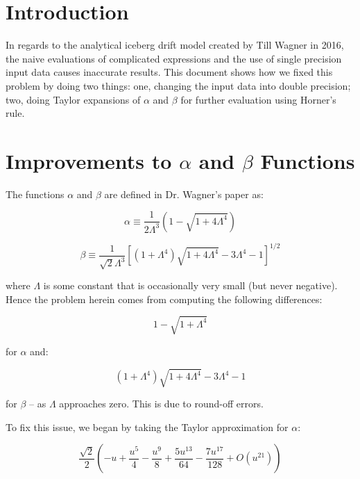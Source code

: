 \documentclass{article}
\begin{document}
\section{Introduction}

    In regards to the analytical iceberg drift model created by Till
Wagner in 2016, the naive evaluations of complicated expressions 
and the use of single precision input data causes inaccurate results. 
This document shows how we fixed this problem by doing two things: 
one, changing the input data into double precision; two, doing Taylor 
expansions of $\alpha$ and $\beta$ for further evaluation using 
Horner's rule.
    
\section{Improvements to $\alpha$ and $\beta$ Functions}
The functions $\alpha$ and $\beta$ are defined in Dr. Wagner's paper
as:

    \begin{equation}
        \alpha \equiv \frac{1}{2\Lambda^3}(1-\sqrt{1+4\Lambda^4})
    \end{equation} 

    \begin{equation}
        \beta \equiv \frac{1}{\sqrt{2}\Lambda^3}[(1+\Lambda^4)
        \sqrt{1+4\Lambda^4} -3\Lambda^4-1]^{1/2}
    \end{equation}


where $\Lambda$ is some constant that is occasionally very small (but
never negative). Hence the problem herein comes from computing the 
following differences:

    \begin{equation}
        1 - \sqrt{1+\Lambda^4}
    \end{equation}

for $\alpha$ and:

    \begin{equation}
       (1+\Lambda^4)\sqrt{1+4\Lambda^4} -3\Lambda^4-1
    \end{equation}


for $\beta$ -- as $\Lambda$ approaches zero. This is due to round-off 
errors.

To fix this issue, we began by taking the Taylor approximation for 
$\alpha$:

    \begin{equation}
        \frac{\sqrt{2}}{2}(-u+\frac{u^5}{4}-\frac{u^9}{8}+
        \frac{5u^{13}}{64}-\frac{7u^{17}}{128}+O(u^{21}))
    \end{equation}
\end{document}

